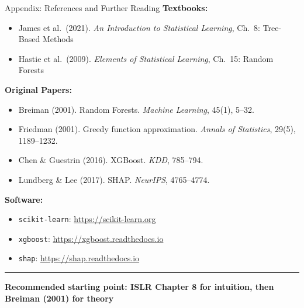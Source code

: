 \documentclass[8pt,aspectratio=169]{beamer}
\newcommand{\bottomnote}[1]{%
\vfill
\vspace{-2mm}
\textcolor{mllavender2}{\rule{\textwidth}{0.4pt}}
\vspace{1mm}
\footnotesize
\textbf{#1}
}
\begin{document}
\begin{frame}[t]{Appendix: References and Further Reading}
\small
\textbf{Textbooks:}
\begin{itemize}
\item James et al.\ (2021). \textit{An Introduction to Statistical Learning}, Ch.\ 8: Tree-Based Methods
\item Hastie et al.\ (2009). \textit{Elements of Statistical Learning}, Ch.\ 15: Random Forests
\end{itemize}

\textbf{Original Papers:}
\begin{itemize}
\item Breiman (2001). Random Forests. \textit{Machine Learning}, 45(1), 5--32.
\item Friedman (2001). Greedy function approximation. \textit{Annals of Statistics}, 29(5), 1189--1232.
\item Chen \& Guestrin (2016). XGBoost. \textit{KDD}, 785--794.
\item Lundberg \& Lee (2017). SHAP. \textit{NeurIPS}, 4765--4774.
\end{itemize}

\textbf{Software:}
\begin{itemize}
\item \texttt{scikit-learn}: \url{https://scikit-learn.org}
\item \texttt{xgboost}: \url{https://xgboost.readthedocs.io}
\item \texttt{shap}: \url{https://shap.readthedocs.io}
\end{itemize}
\bottomnote{Recommended starting point: ISLR Chapter 8 for intuition, then Breiman (2001) for theory}
\end{frame}
\end{document}
